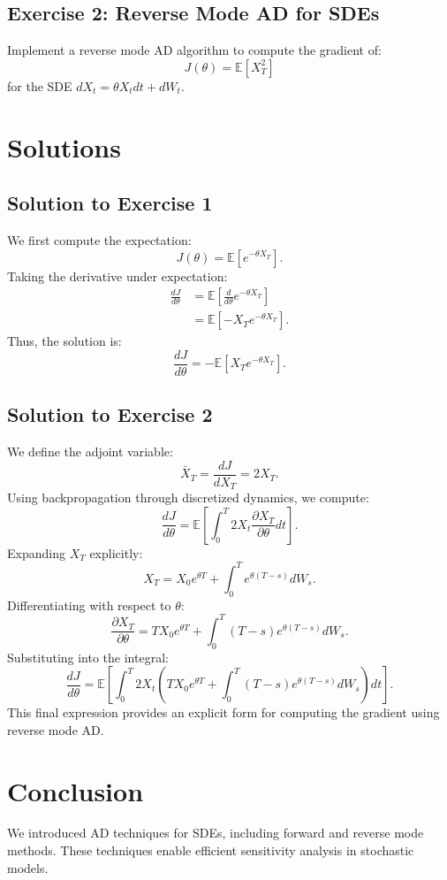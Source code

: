\documentclass{article}
\begin{document}
	\subsection{Exercise 2: Reverse Mode AD for SDEs}
	Implement a reverse mode AD algorithm to compute the gradient of:
	\begin{equation}
		J(\theta) = \mathbb{E}[X_T^2]
	\end{equation}
	for the SDE $dX_t = \theta X_t dt + dW_t$.
	
	\section{Solutions}
	\subsection{Solution to Exercise 1}
	We first compute the expectation:
	\begin{equation}
		J(\theta) = \mathbb{E}[e^{-\theta X_T}].
	\end{equation}
	Taking the derivative under expectation:
	\begin{align*}
		\frac{dJ}{d\theta} &= \mathbb{E}\left[\frac{d}{d\theta} e^{-\theta X_T}\right] \\
		&= \mathbb{E}\left[-X_T e^{-\theta X_T}\right].
	\end{align*}
	Thus, the solution is:
	\begin{equation}
		\frac{dJ}{d\theta} = -\mathbb{E}[X_T e^{-\theta X_T}].
	\end{equation}
	
	\subsection{Solution to Exercise 2}
	We define the adjoint variable:
	\begin{equation}
		\bar{X}_T = \frac{dJ}{dX_T} = 2X_T.
	\end{equation}
	Using backpropagation through discretized dynamics, we compute:
	\begin{equation}
		\frac{dJ}{d\theta} = \mathbb{E} \left[ \int_0^T 2X_t \frac{\partial X_T}{\partial \theta} dt \right].
	\end{equation}
	Expanding $X_T$ explicitly:
	\begin{equation}
		X_T = X_0 e^{\theta T} + \int_0^T e^{\theta (T - s)} dW_s.
	\end{equation}
	Differentiating with respect to $\theta$:
	\begin{equation}
		\frac{\partial X_T}{\partial \theta} = T X_0 e^{\theta T} + \int_0^T (T - s) e^{\theta (T - s)} dW_s.
	\end{equation}
	Substituting into the integral:
	\begin{equation}
		\frac{dJ}{d\theta} = \mathbb{E} \left[ \int_0^T 2X_t \left(T X_0 e^{\theta T} + \int_0^T (T - s) e^{\theta (T - s)} dW_s \right) dt \right].
	\end{equation}
	This final expression provides an explicit form for computing the gradient using reverse mode AD.
	
	\section{Conclusion}
	We introduced AD techniques for SDEs, including forward and reverse mode methods. These techniques enable efficient sensitivity analysis in stochastic models.
	
	
	
	
\end{document}
